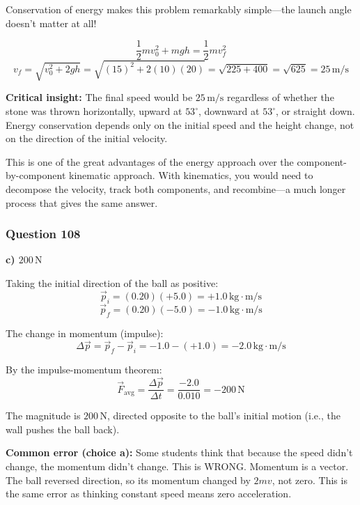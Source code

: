 \documentclass[12pt,letterpaper]{article}
\begin{document}
\begin{explanationbox}
Conservation of energy makes this problem remarkably simple---the launch angle doesn't matter at all!

\[
\frac{1}{2}mv_0^2 + mgh = \frac{1}{2}mv_f^2
\]
\[
v_f = \sqrt{v_0^2 + 2gh} = \sqrt{(15)^2 + 2(10)(20)} = \sqrt{225 + 400} = \sqrt{625} = 25\,\text{m/s}
\]

\textbf{Critical insight:} The final speed would be $25\,\text{m/s}$ regardless of whether the stone was thrown horizontally, upward at $53^\circ$, downward at $53^\circ$, or straight down. Energy conservation depends only on the initial speed and the height change, not on the direction of the initial velocity.

This is one of the great advantages of the energy approach over the component-by-component kinematic approach. With kinematics, you would need to decompose the velocity, track both components, and recombine---a much longer process that gives the same answer.
\end{explanationbox}

\subsubsection*{Question 108}

\begin{answerbox}
\textbf{c) $200\,\text{N}$}
\end{answerbox}

\begin{explanationbox}
Taking the initial direction of the ball as positive:
\[
\vec{p}_i = (0.20)(+5.0) = +1.0\,\text{kg}\cdot\text{m/s}
\]
\[
\vec{p}_f = (0.20)(-5.0) = -1.0\,\text{kg}\cdot\text{m/s}
\]

The change in momentum (impulse):
\[
\Delta \vec{p} = \vec{p}_f - \vec{p}_i = -1.0 - (+1.0) = -2.0\,\text{kg}\cdot\text{m/s}
\]

By the impulse-momentum theorem:
\[
\vec{F}_{\text{avg}} = \frac{\Delta\vec{p}}{\Delta t} = \frac{-2.0}{0.010} = -200\,\text{N}
\]

The magnitude is $200\,\text{N}$, directed opposite to the ball's initial motion (i.e., the wall pushes the ball back).

\textbf{Common error (choice a):} Some students think that because the speed didn't change, the momentum didn't change. This is WRONG. Momentum is a vector. The ball reversed direction, so its momentum changed by $2mv$, not zero. This is the same error as thinking constant speed means zero acceleration.
\end{explanationbox}
\end{document}
